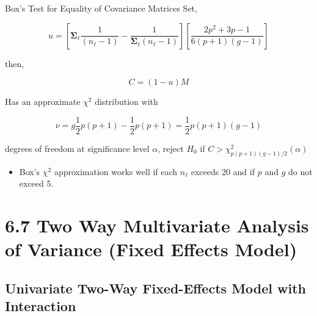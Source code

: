\documentclass[8pt]{beamer}
\begin{document}
    \begin{frame}{Box's Test for Equality of Covariance Matrices}
        Set, 
        
        \begin{equation}
            u = \left[\mathbf{\Sigma_{\ell}} \frac{1}{(n_{\ell} - 1)} - \frac{1}{\mathbf{\Sigma_{\ell}}(n_{\ell} - 1)}\right]\left[ \frac{2p^{2} + 3p - 1}{6(p + 1)(g - 1)} \right]
        \end{equation}
        
        then, 
        
        \begin{equation}
            C = (1 - u)M
        \end{equation}
        
        Has an approximate $\chi^{2}$ distribution with
        
        \begin{equation}
            \nu = g\frac{1}{2}p(p + 1) - \frac{1}{2}p(p + 1) = \frac{1}{2}p(p+1)(g-1)
        \end{equation}
        
        degrees of freedom at significance level $\alpha$, reject $H_{0}$ if $C > \chi^{2}_{p(p+1)(g-1)/2}(\alpha)$
        
        \begin{itemize}
            \item Box's $\chi^{2}$ approximation works well if each $n_{\ell}$ exceeds 20 and if $p$ and $g$ do not exceed 5.
        \end{itemize}
        
    \end{frame}

\section{6.7 Two Way Multivariate Analysis of Variance (Fixed Effects Model)}

\subsection{Univariate Two-Way Fixed-Effects Model with Interaction}
\end{document}
